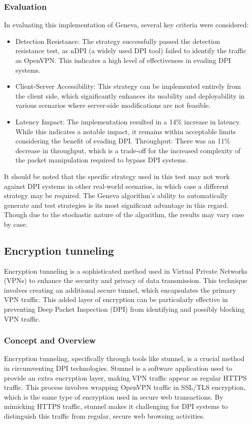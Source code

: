 \documentclass[12pt, fleqn, a4paper]{article}
\begin{document}
\subsubsection{Evaluation}
In evaluating this implementation of Geneva, several key criteria were considered:
\begin{itemize}
\item Detection Resistance: The strategy successfully passed the detection resistance test, as nDPI (a widely used DPI tool) failed to identify the traffic as OpenVPN. This indicates a high level of effectiveness in evading DPI systems.
\item Client-Server Accessibility: This strategy can be implemented entirely from the client side, which significantly enhances its usability and deployability in various scenarios where server-side modifications are not feasible.
\item Latency Impact: The implementation resulted in a 14\% increase in latency. While this indicates a notable impact, it remains within acceptable limits considering the benefit of evading DPI.
Throughput: There was an 11\% decrease in throughput, which is a trade-off for the increased complexity of the packet manipulation required to bypass DPI systems.
\end{itemize}
It should be noted that the specific strategy used in this test may not work against DPI systems in other real-world scenarios, in which case a different strategy may be required. The Geneva algorithm's ability to automatically generate and test strategies is its most significant advantage in this regard. Though due to the stochastic nature of the algorithm, the results may vary case by case.
\subsection{Encryption tunneling}
Encryption tunneling is a sophisticated method used in Virtual Private Networks (VPNs) to enhance the security and privacy of data transmission. This technique involves creating an additional secure tunnel, which encapsulates the primary VPN traffic. This added layer of encryption can be particularly effective in preventing Deep Packet Inspection (DPI) from identifying and possibly blocking VPN traffic.
\subsubsection{Concept and Overview}
Encryption tunneling, specifically through tools like stunnel, is a crucial method in circumventing DPI technologies. Stunnel is a software application used to provide an extra encryption layer, making VPN traffic appear as regular HTTPS traffic. This process involves wrapping OpenVPN traffic in SSL/TLS encryption, which is the same type of encryption used in secure web transactions. By mimicking HTTPS traffic, stunnel makes it challenging for DPI systems to distinguish this traffic from regular, secure web browsing activities.
\end{document}
